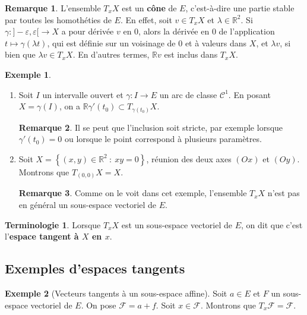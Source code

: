 \documentclass[french]{article}
\newcommand{\R}{\mathbb{R}}
\theoremstyle{plain}
\theoremstyle{definition}
\newtheorem*{ex}{Exemple}
\newtheorem*{rmq}{Remarque}
\newtheorem*{terminologie}{Terminologie}
\theoremstyle{remark}
\begin{document}
\begin{rmq}
	L'ensemble $T_xX$ est un \textbf{cône} de $E$, c'est-à-dire une partie stable par toutes les homothéties de $E$. En effet, soit $v\in T_xX$ et $\lambda\in\R^2$. Si $\gamma:]-\varepsilon,\varepsilon[\to X$ a pour dérivée $v$ en $0$, alors la dérivée en $0$ de l'application $t\mapsto\gamma(\lambda t)$, qui est définie sur un voisinage de $0$ et à valeurs dans $X$, et $\lambda v$, si bien que $\lambda v\in T_xX$. En d'autres termes, $\R v$ est inclus dans $T_x X$.
\end{rmq}

\begin{ex}
	\begin{enumerate}
		\item Soit $I$ un intervalle ouvert et $\gamma :I\to E$ un arc de classe $\mathcal{C}^1$. En posant $X=\gamma(I)$, on a $\R\gamma'(t_0)\subset T_{\gamma(t_0)}X$. %
		\begin{rmq}
			Il se peut que l'inclusion soit stricte, par exemple lorsque $\gamma'(t_0)=0$ ou lorsque le point correspond à plusieurs paramètres. %
		\end{rmq}
		\item Soit $X=\left\{(x,y)\in\R^2\ :\ xy=0\right\}$, réunion des deux axes $(Ox)$ et $(Oy)$. Montrons que $T_{(0,0)}X=X$.
		\begin{rmq}
			Comme on le voit dans cet exemple, l'ensemble $T_xX$ n'est pas en général un sous-espace vectoriel de $E$.
		\end{rmq}
	\end{enumerate}
\end{ex}

\begin{terminologie}
	Lorsque $T_xX$ est un sous-espace vectoriel de $E$, on dit que c'est l'\textbf{espace tangent à $X$ en $x$}.
\end{terminologie}

\subsection{Exemples d'espaces tangents}

\begin{ex}[Vecteurs tangents à un sous-espace affine]
	Soit $a\in E$ et $F$ un sous-espace vectoriel de $E$. On pose $\mathcal{F}=a+f$. Soit $x\in\mathcal{F}$. Montrons que $T_x\mathcal{F}=\mathcal{F}$.
\end{ex}
\end{document}
